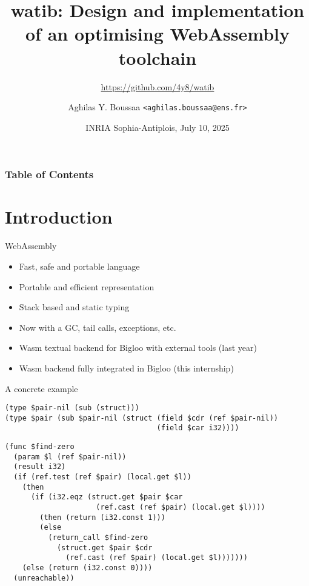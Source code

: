 \documentclass{beamer}
\author{Aghilas Y. Boussaa \texttt{<aghilas.boussaa@ens.fr>}}
\title{watib: Design and implementation of an optimising WebAssembly toolchain}
\subtitle{\url{https://github.com/4y8/watib}}
\institute{École normale supérieure}
\begin{document}
\frame{\titlepage}
\date{INRIA Sophia-Antiplois, July 10, 2025}
\begin{frame}
\frametitle{Table of Contents}
\tableofcontents
\end{frame}

\section{Introduction}
\begin{frame}{WebAssembly}
  \begin{itemize}
    \item Fast, safe and portable language
    \item Portable and efficient representation
    \item Stack based and static typing\pause
    \item Now with a GC, tail calls, exceptions, etc.\pause
    \item Wasm textual backend for Bigloo with external tools (last year)\pause
    \item Wasm backend fully integrated in Bigloo (this internship)
  \end{itemize}
\end{frame}
\begin{frame}[fragile]{A concrete example}
\footnotesize
\begin{verbatim}
(type $pair-nil (sub (struct)))
(type $pair (sub $pair-nil (struct (field $cdr (ref $pair-nil))
                                   (field $car i32))))
\end{verbatim}
\pause
\begin{verbatim}
(func $find-zero
  (param $l (ref $pair-nil))
  (result i32)
  (if (ref.test (ref $pair) (local.get $l))
    (then
      (if (i32.eqz (struct.get $pair $car
                     (ref.cast (ref $pair) (local.get $l))))
        (then (return (i32.const 1)))
        (else
          (return_call $find-zero
            (struct.get $pair $cdr
              (ref.cast (ref $pair) (local.get $l)))))))
    (else (return (i32.const 0))))
  (unreachable))
\end{verbatim}
\end{frame}
\end{document}
